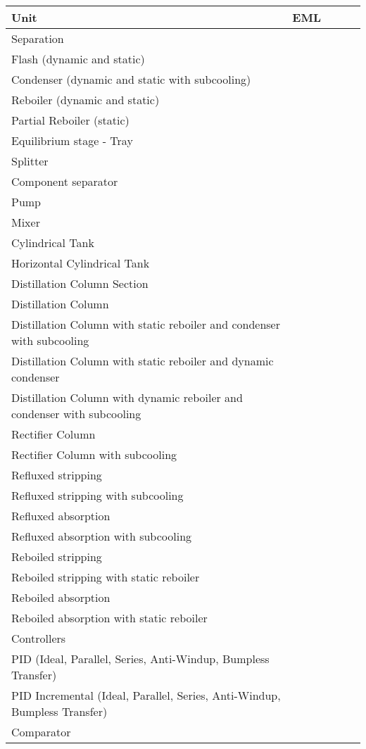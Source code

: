 \begin{table}[htbp]
  \centering
  \begin{tabular}{lllll}
    \toprule
    Unit & EML \\
    \midrule
    Separation \\
    Flash (dynamic and static) \\
    Condenser (dynamic and static with subcooling) \\
    Reboiler (dynamic and static) \\
    Partial Reboiler (static) \\
    Equilibrium stage - Tray \\
    Splitter \\
    Component separator \\
    Pump \\
    Mixer \\
    Cylindrical Tank \\
    Horizontal Cylindrical Tank \\
    Distillation Column Section \\
    Distillation Column \\
    Distillation Column with static reboiler and condenser with subcooling \\
    Distillation Column with static reboiler and dynamic condenser \\
    Distillation Column with dynamic reboiler and condenser with subcooling \\
    Rectifier Column \\
    Rectifier Column with subcooling \\
    Refluxed stripping \\
    Refluxed stripping with subcooling \\
    Refluxed absorption \\
    Refluxed absorption with subcooling \\
    Reboiled stripping \\
    Reboiled stripping with static reboiler \\
    Reboiled absorption \\
    Reboiled absorption with static reboiler \\
    Controllers \\
    PID (Ideal, Parallel, Series, Anti-Windup, Bumpless Transfer) \\
    PID Incremental (Ideal, Parallel, Series, Anti-Windup, Bumpless Transfer) \\
    Comparator \\

\end{tabular}
\end{table}
